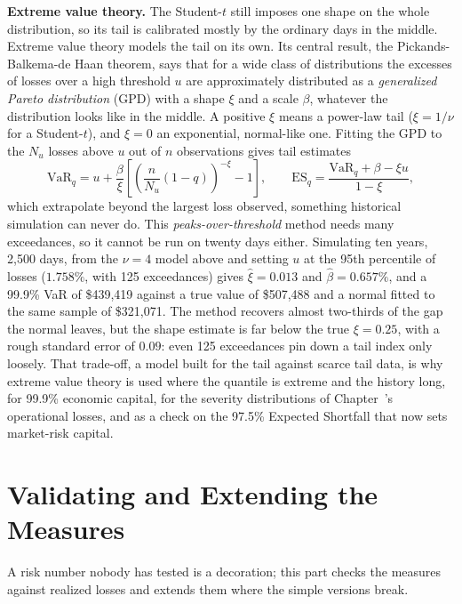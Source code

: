 \documentclass[../ai_in_finance]{subfiles}
\begin{document}
\textbf{Extreme value theory.} The Student-$t$ still imposes one shape on the whole distribution, so its tail is calibrated mostly by the ordinary days in the middle. Extreme value theory models the tail on its own. Its central result, the Pickands-Balkema-de Haan theorem, says that for a wide class of distributions the excesses of losses over a high threshold $u$ are approximately distributed as a \emph{generalized Pareto distribution} (GPD) with a shape $\xi$ and a scale $\beta$, whatever the distribution looks like in the middle. A positive $\xi$ means a power-law tail ($\xi=1/\nu$ for a Student-$t$), and $\xi=0$ an exponential, normal-like one. Fitting the GPD to the $N_u$ losses above $u$ out of $n$ observations gives tail estimates
\begin{equation*}
\text{VaR}_q = u + \frac{\beta}{\xi}\left[\left(\frac{n}{N_u}(1-q)\right)^{-\xi} - 1\right], \qquad
\text{ES}_q = \frac{\text{VaR}_q + \beta - \xi u}{1-\xi},
\end{equation*}
which extrapolate beyond the largest loss observed, something historical simulation can never do. This \emph{peaks-over-threshold} method needs many exceedances, so it cannot be run on twenty days either. Simulating ten years, 2,500 days, from the $\nu=4$ model above and setting $u$ at the 95th percentile of losses ($1.758\%$, with 125 exceedances) gives $\hat\xi = 0.013$ and $\hat\beta = 0.657\%$, and a 99.9\% VaR of \$439,419 against a true value of \$507,488 and a normal fitted to the same sample of \$321,071. The method recovers almost two-thirds of the gap the normal leaves, but the shape estimate is far below the true $\xi=0.25$, with a rough standard error of $0.09$: even 125 exceedances pin down a tail index only loosely. That trade-off, a model built for the tail against scarce tail data, is why extreme value theory is used where the quantile is extreme and the history long, for 99.9\% economic capital, for the severity distributions of Chapter~'s operational losses, and as a check on the 97.5\% Expected Shortfall that now sets market-risk capital.

\section{Validating and Extending the Measures}

A risk number nobody has tested is a decoration; this part checks the measures against realized losses and extends them where the simple versions break.
\end{document}
